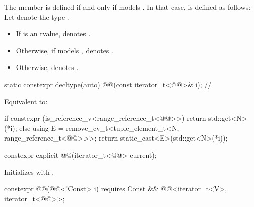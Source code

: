 \pnum
The member   is defined
if and only if  models .
In that case,  is defined as follows:
Let  denote the type
.
\begin{itemize}
\item
If  is an rvalue,
 denotes .
\item
Otherwise, if  models ,
 denotes .
\item
Otherwise,  denotes .
\end{itemize}

%
\begin{itemdecl}
static constexpr decltype(auto) @@(const iterator_t<@@>& i);     // \expos
\end{itemdecl}

\begin{itemdescr}
\pnum
\effects
Equivalent to:
\begin{codeblock}
if constexpr (is_reference_v<range_reference_t<@@>>) {
  return std::get<N>(*i);
} else {
  using E = remove_cv_t<tuple_element_t<N, range_reference_t<@@>>>;
  return static_cast<E>(std::get<N>(*i));
}
\end{codeblock}
\end{itemdescr}

%
\begin{itemdecl}
constexpr explicit @@(iterator_t<@@> current);
\end{itemdecl}

\begin{itemdescr}
\pnum
\effects
Initializes  with .
\end{itemdescr}

%
\begin{itemdecl}
constexpr @@(@@<!Const> i)
  requires Const && @@<iterator_t<V>, iterator_t<@@>>;
\end{itemdecl}


